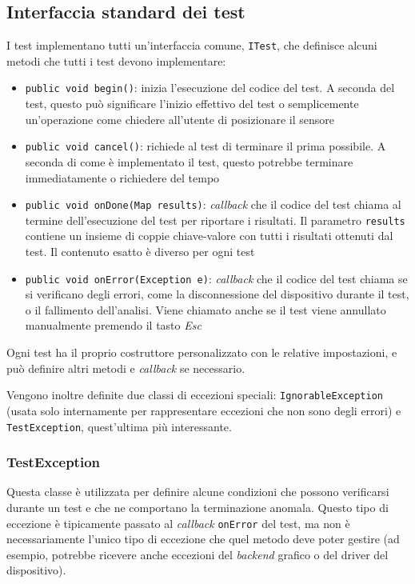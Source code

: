 \subsection{Interfaccia standard dei test}
I test implementano tutti un'interfaccia comune, \texttt{ITest}, che definisce alcuni metodi che tutti i test devono implementare:
\begin{itemize}
	\item \texttt{public void begin()}: inizia l'esecuzione del codice del test. A seconda del test, questo può significare l'inizio effettivo del test o semplicemente un'operazione come chiedere all'utente di posizionare il sensore
	\item \texttt{public void cancel()}: richiede al test di terminare il prima possibile. A seconda di come è implementato il test, questo potrebbe terminare immediatamente o richiedere del tempo
	\item \texttt{public void onDone(Map results)}: \textit{callback} che il codice del test chiama al termine dell'esecuzione del test per riportare i risultati. Il parametro \texttt{results} contiene un insieme di coppie chiave-valore con tutti i risultati ottenuti dal test. Il contenuto esatto è diverso per ogni test
	\item \texttt{public void onError(Exception e)}: \textit{callback} che il codice del test chiama se si verificano degli errori, come la disconnessione del dispositivo durante il test, o il fallimento dell'analisi. Viene chiamato anche se il test viene annullato manualmente premendo il tasto \textit{Esc}
\end{itemize}

Ogni test ha il proprio costruttore personalizzato con le relative impostazioni, e può definire altri metodi e \textit{callback} se necessario.

Vengono inoltre definite due classi di eccezioni speciali: \texttt{IgnorableException} (usata solo internamente per rappresentare eccezioni che non sono degli errori) e \texttt{TestException}, quest'ultima più interessante.

\subsubsection{TestException}
Questa classe è utilizzata per definire alcune condizioni che possono verificarsi durante un test e che ne comportano la terminazione anomala. Questo tipo di eccezione è tipicamente passato al \textit{callback} \texttt{onError} del test, ma non è necessariamente l'unico tipo di eccezione che quel metodo deve poter gestire (ad esempio, potrebbe ricevere anche eccezioni del \textit{backend} grafico o del driver del dispositivo).

